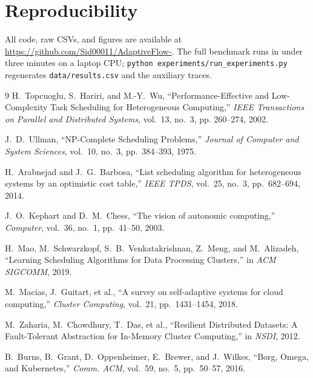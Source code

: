 \documentclass[conference]{IEEEtran}
\begin{document}
\section*{Reproducibility}
All code, raw CSVs, and figures are available at
\url{https://github.com/Sid00011/AdaptiveFlow-}. The full benchmark runs in
under three minutes on a laptop CPU; \texttt{python experiments/run\_experiments.py}
regenerates \texttt{data/results.csv} and the auxiliary traces.

\begin{thebibliography}{9}
H.~Topcuoglu, S.~Hariri, and M.-Y.~Wu, ``Performance-Effective and
Low-Complexity Task Scheduling for Heterogeneous Computing,'' \emph{IEEE
Transactions on Parallel and Distributed Systems}, vol.~13, no.~3, pp.
260--274, 2002.

J.~D.~Ullman, ``NP-Complete Scheduling Problems,'' \emph{Journal of
Computer and System Sciences}, vol.~10, no.~3, pp.~384--393, 1975.

H.~Arabnejad and J.~G.~Barbosa, ``List scheduling algorithm for
heterogeneous systems by an optimistic cost table,'' \emph{IEEE TPDS},
vol.~25, no.~3, pp.~682--694, 2014.

J.~O.~Kephart and D.~M.~Chess, ``The vision of autonomic computing,''
\emph{Computer}, vol.~36, no.~1, pp.~41--50, 2003.

H.~Mao, M.~Schwarzkopf, S.~B.~Venkatakrishnan, Z.~Meng, and M.~Alizadeh,
``Learning Scheduling Algorithms for Data Processing Clusters,'' in
\emph{ACM SIGCOMM}, 2019.

M.~Macias, J.~Guitart, et al., ``A survey on self-adaptive systems for
cloud computing,'' \emph{Cluster Computing}, vol.~21, pp.~1431--1454, 2018.

M.~Zaharia, M.~Chowdhury, T.~Das, et al., ``Resilient Distributed Datasets:
A Fault-Tolerant Abstraction for In-Memory Cluster Computing,'' in
\emph{NSDI}, 2012.

B.~Burns, B.~Grant, D.~Oppenheimer, E.~Brewer, and J.~Wilkes, ``Borg,
Omega, and Kubernetes,'' \emph{Comm. ACM}, vol.~59, no.~5, pp.~50--57, 2016.
\end{thebibliography}
\end{document}
